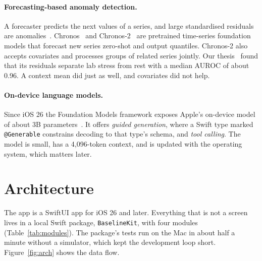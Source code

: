 \documentclass[11pt,a4paper]{article}
\begin{document}
\paragraph{Forecasting-based anomaly detection.} A forecaster predicts the next values of a series, and large standardised residuals are anomalies~\cite{hundman2018telemanom}. Chronos~\cite{ansari2024chronos} and Chronos-2~\cite{ansari2025chronos2} are pretrained time-series foundation models that forecast new series zero-shot and output quantiles. Chronos-2 also accepts covariates and processes groups of related series jointly. Our thesis~\cite{jankovikj2026chronos} found that its residuals separate lab stress from rest with a median AUROC of about 0.96. A context mean did just as well, and covariates did not help.

\paragraph{On-device language models.} Since iOS 26 the Foundation Models framework exposes Apple's on-device model of about 3B parameters~\cite{apple2025afm}. It offers \emph{guided generation}, where a Swift type marked \texttt{@Generable} constrains decoding to that type's schema, and \emph{tool calling}. The model is small, has a 4{,}096-token context, and is updated with the operating system, which matters later.

\section{Architecture}

The app is a SwiftUI app for iOS 26 and later. Everything that is not a screen lives in a local Swift package, \texttt{BaselineKit}, with four modules (Table~\ref{tab:modules}). The package's tests run on the Mac in about half a minute without a simulator, which kept the development loop short. Figure~\ref{fig:arch} shows the data flow.
\end{document}
